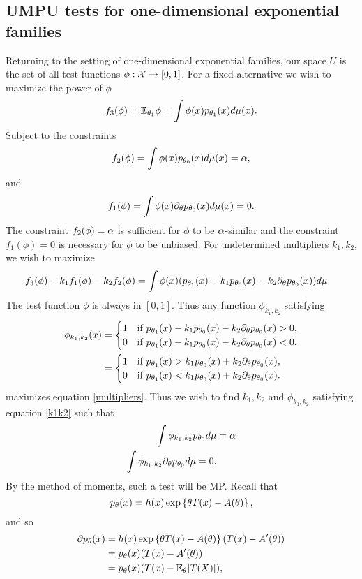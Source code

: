 \subsection{UMPU tests for one-dimensional exponential families}
Returning to the setting of one-dimensional exponential families, our space $U$ is the set of all test functions $\phi : {\mathcal{X}} \to [0,1]$. For a fixed alternative we wish to maximize the power of $\phi$
\[f_3(\phi)={\mathbb{E}}_{{\theta}_1}\phi = \int \phi(x)p_{{\theta}_1}(x)d\mu(x). \]
Subject to the constraints
\[f_2(\phi)=\int \phi(x)p_{{\theta}_0}(x)d\mu(x) = {\alpha}, \]
and
\[f_1(\phi) = \int \phi(x) \partial_{\theta} p_{{\theta}_0}(x)d\mu(x) = 0. \]
The constraint $f_2(\phi)={\alpha}$ is sufficient for $\phi$ to be ${\alpha}$-similar and the constraint $f_1(\phi)=0$ is necessary for $\phi$ to be unbiased. For undetermined multipliers $k_1,k_2$, we wish to maximize
\begin{align}\label{multipliers}
    f_3(\phi)-k_1f_1(\phi)-k_2f_2(\phi) &= \int \phi(x)(p_{{\theta}_1}(x)-k_1p_{{\theta}_0}(x)-k_2\partial_{\theta} p_{{\theta}_0}(x))d\mu 
\end{align}
The test function $\phi$ is always in $[0,1]$. Thus any function $\phi_{k_1,k_2}$ satisfying
\begin{align}\label{k1k2}
    \phi_{k_1,k_2}(x) &=\begin{cases}
        1 &\text{if }p_{{\theta}_1}(x)-k_1p_{{\theta}_0}(x)-k_2\partial_{\theta} p_{{\theta}_0}(x)>0,\\
        0 & \text{if }p_{{\theta}_1}(x)-k_1p_{{\theta}_0}(x)-k_2\partial_{\theta} p_{{\theta}_0}(x)<0.
    \end{cases}\nonumber\\
    &=\begin{cases}
        1 &\text{if }p_{{\theta}_1}(x)>k_1p_{{\theta}_0}(x)+k_2\partial_{\theta} p_{{\theta}_0}(x),\\
        0 & \text{if }p_{{\theta}_1}(x)<k_1p_{{\theta}_0}(x)+k_2\partial_{\theta} p_{{\theta}_0}(x).
    \end{cases}
\end{align}
maximizes equation \eqref{multipliers}. Thus we wish to find $k_1,k_2$ and $\phi_{k_1,k_2}$ satisfying equation \eqref{k1k2} such that 
\begin{align*}
    \int \phi_{k_1,k_2} p_{{\theta}_0}d\mu &={\alpha} \\
    \int \phi_{k_1,k_2} \partial_{\theta} p_{{\theta}_0} d\mu =0.
\end{align*}
By the method of moments, such a test will be MP. Recall that 
\[p_{\theta}(x)=h(x)\exp\left\{{\theta} T(x)-A({\theta})\right\}, \]
and so 
\begin{align*} 
    \partial p_{\theta}(x)& = h(x)\exp\left\{{\theta} T(x)-A({\theta})\right\}(T(x)-A'({\theta}))\\
    &=p_{\theta}(x)(T(x)-A'({\theta}))\\
    &=p_{\theta}(x)(T(x)-{\mathbb{E}}_{\theta}[T(X)]),
\end{align*}
